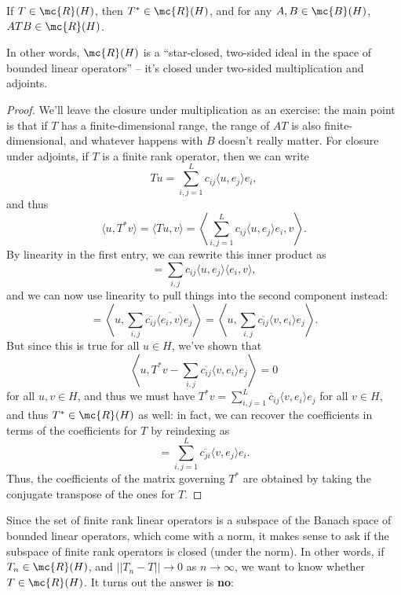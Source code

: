 \begin{theorem}
If $T \in \mc{R}(H)$, then $T^\ast \in \mc{R}(H)$, and for any $A, B \in \mc{B}(H)$, $ATB \in \mc{R}(H)$. 
\end{theorem}
 
In other words, $\mc{R}(H)$ is a ``star-closed, two-sided ideal in the space of bounded linear operators'' -- it's closed under two-sided multiplication and adjoints.

\begin{proof}
We'll leave the closure under multiplication as an exercise: the main point is that if $T$ has a finite-dimensional range, the range of $AT$ is also finite-dimensional, and whatever happens with $B$ doesn't really matter. For closure under adjoints, if $T$ is a finite rank operator, then we can write
\[
    Tu = \sum_{i,j=1}^L c_{ij} \langle u, e_j \rangle e_i,
\]
and thus 
\[
    \langle u, T^\ast v \rangle = \langle Tu, v \rangle = \left\langle \sum_{i,j=1}^L c_{ij} \langle u, e_j \rangle e_i, v \right\rangle.
\]
By linearity in the first entry, we can rewrite this inner product as 
\[
    = \sum_{i,j} c_{ij} \langle u, e_j \rangle \langle e_i, v \rangle,
\]
and we can now use linearity to pull things into the second component instead:
\[
    = \left\langle u, \sum_{i,j} \overline{c_{ij}} \overline{\langle e_i, v \rangle} e_j \right\rangle = \left\langle u, \sum_{i,j} \overline{c_{ij}} \langle v, e_i \rangle e_j \right\rangle.
\]
But since this is true for all $u \in H$, we've shown that 
\[
    \left\langle u, T^\ast v -  \sum_{i,j} \overline{c_{ij}} \langle v, e_i \rangle e_j \right\rangle = 0
\]
for all $u, v \in H$, and thus we must have $T^\ast v = \sum_{i,j=1}^{L} \overline{c}_{ij} \langle v, e_i \rangle e_j$ for all $v \in H$, and thus $T^\ast \in \mc{R}(H)$ as well: in fact, we can recover the coefficients in terms of the coefficients for $T$ by reindexing as 
\[
    = \sum_{i,j=1}^L \overline{c_{ji}} \langle v, e_j \rangle e_i.
\]
Thus, the coefficients of the matrix governing $T^\ast$ are obtained by taking the conjugate transpose of the ones for $T$.
\end{proof}

Since the set of finite rank linear operators is a subspace of the Banach space of bounded linear operators, which come with a norm, it makes sense to ask if the subspace of finite rank operators is closed (under the norm). In other words, if $T_n \in \mc{R}(H)$, and $||T_n - T|| \to 0$ as $n \to \infty$, we want to know whether $T \in \mc{R}(H)$. It turns out the answer is \textbf{no}:

